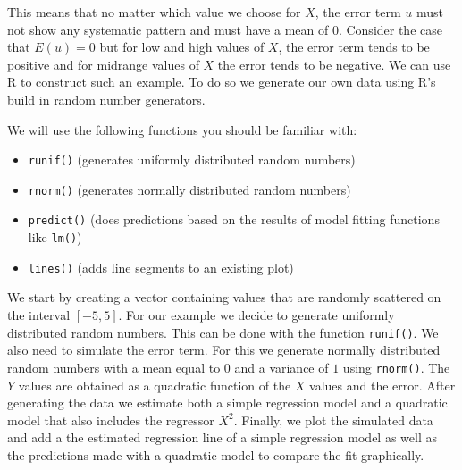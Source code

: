 \documentclass[]{book}
\providecommand{\tightlist}{%
  \setlength{\itemsep}{0pt}\setlength{\parskip}{0pt}}
\theoremstyle{definition}
\theoremstyle{definition}
\theoremstyle{definition}
\theoremstyle{remark}
\begin{document}
This means that no matter which value we choose for \(X\), the error
term \(u\) must not show any systematic pattern and must have a mean of
\(0\). Consider the case that \(E(u) = 0\) but for low and high values
of \(X\), the error term tends to be positive and for midrange values of
\(X\) the error tends to be negative. We can use R to construct such an
example. To do so we generate our own data using R's build in random
number generators.

We will use the following functions you should be familiar with:

\begin{itemize}
\tightlist
\item
  \texttt{runif()} (generates uniformly distributed random numbers)
\item
  \texttt{rnorm()} (generates normally distributed random numbers)
\item
  \texttt{predict()} (does predictions based on the results of model
  fitting functions like \texttt{lm()})
\item
  \texttt{lines()} (adds line segments to an existing plot)
\end{itemize}

We start by creating a vector containing values that are randomly
scattered on the interval \([-5,5]\). For our example we decide to
generate uniformly distributed random numbers. This can be done with the
function \texttt{runif()}. We also need to simulate the error term. For
this we generate normally distributed random numbers with a mean equal
to \(0\) and a variance of \(1\) using \texttt{rnorm()}. The \(Y\)
values are obtained as a quadratic function of the \(X\) values and the
error. After generating the data we estimate both a simple regression
model and a quadratic model that also includes the regressor \(X^2\).
Finally, we plot the simulated data and add a the estimated regression
line of a simple regression model as well as the predictions made with a
quadratic model to compare the fit graphically.
\end{document}
